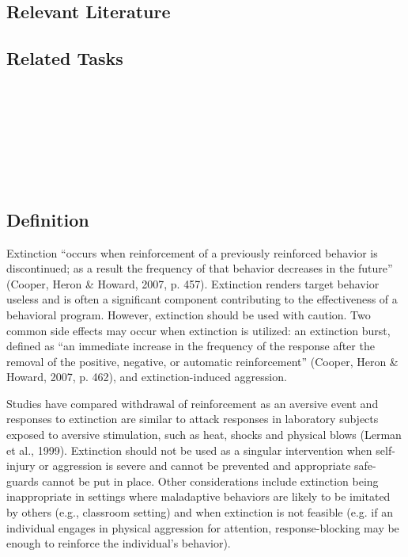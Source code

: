 \subsection{Relevant Literature}
\begin{refsection}
\nocite{azrin1966punishment,
    catania1998learning,
    cooper2007applied,
    iwata1994toward,
    may1976guidelines,
    white1980exceptional}
\printbibliography[heading=none]
\end{refsection}  
%
\subsection{Related Tasks}
\fourcTwo{}\\
\fourdSixteen{}\\
\fourdSeventeen{}\\
\fourdNineteen{}\\
\foureSeven{}\\
\fourFKThirtyOne{}\\
%
%
%
%
%
%
\section[\fourcThree{}]{\fourcThree{}%
              }
\subsection{Definition}
Extinction ``occurs when reinforcement of a previously reinforced behavior is discontinued; as a result the frequency of that behavior decreases in the future'' (Cooper, Heron \& Howard, 2007, p. 457). Extinction renders target behavior useless and is often a significant component contributing to the effectiveness of a behavioral program. However, extinction should be used with caution. Two common side effects may occur when extinction is utilized: an extinction burst, defined as ``an immediate increase in the frequency of the response after the removal of the positive, negative, or automatic reinforcement'' (Cooper, Heron \& Howard, 2007, p. 462), and extinction-induced aggression.

Studies have compared withdrawal of reinforcement as an aversive event and responses to extinction are similar to attack responses in laboratory subjects exposed to aversive stimulation, such as heat, shocks and physical blows (Lerman et al., 1999). Extinction should not be used as a singular intervention when self-injury or aggression is severe and cannot be prevented and appropriate safe-guards cannot be put in place. Other considerations include extinction being inappropriate in settings where maladaptive behaviors are likely to be imitated by others (e.g., classroom setting) and when extinction is not feasible (e.g. if an individual engages in physical aggression for attention, response-blocking may be enough to reinforce the individual's behavior). 

